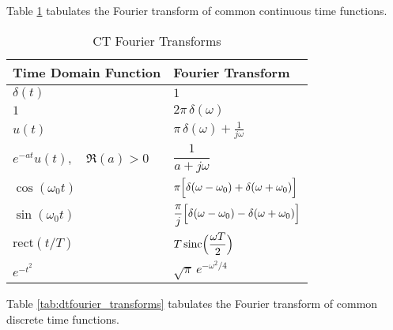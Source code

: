 Table \ref{tab:ctfourier_transforms} tabulates the
Fourier transform of common continuous time functions.

\begin{table}[ht]
    \centering
    \caption{CT Fourier Transforms}
    \label{tab:ctfourier_transforms}
    \begin{tabular}{ll}
        \toprule
        \textbf{Time Domain Function} & \textbf{Fourier Transform}                                                    \\
        \midrule
        $\delta(t)$                   & $1$                                                                           \\[1mm]
        $1$                           & $2\pi\,\delta(\omega)$                                                        \\[1mm]
        $u(t)$                        & $\pi\,\delta(\omega) + \frac{1}{j\omega}$                                     \\[1mm]
        $e^{-at}u(t),\quad \Re(a)>0$  & $\dfrac{1}{a+j\omega}$                                                        \\[1mm]
        $\cos(\omega_0 t)$            & $\pi\Bigl[\delta(\omega-\omega_0) + \delta(\omega+\omega_0)\Bigr]$            \\[1mm]
        $\sin(\omega_0 t)$            & $\dfrac{\pi}{j}\Bigl[\delta(\omega-\omega_0) - \delta(\omega+\omega_0)\Bigr]$ \\[1mm]
        $\mathrm{rect}(t/T)$          & $T\,\mathrm{sinc}\Bigl(\dfrac{\omega T}{2}\Bigr)$                             \\[1mm]
        $e^{-t^2}$                    & $\sqrt{\pi}\,e^{-\omega^2/4}$                                                 \\
        \bottomrule
    \end{tabular}
\end{table}

Table \ref{tab:dtfourier_transforms} tabulates the
Fourier transform of common discrete time functions.

